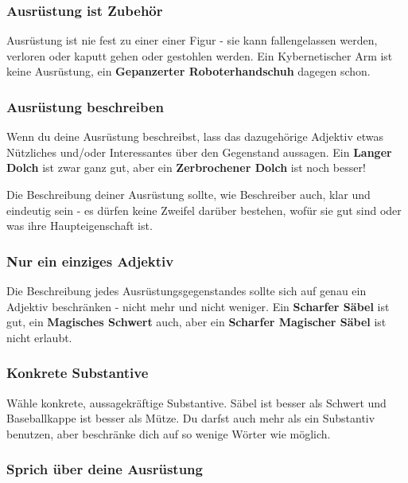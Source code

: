 \documentclass[]{article}
\begin{document}
\subsubsection{Ausrüstung ist
Zubehör}\label{ausruxfcstung-ist-zubehuxf6r}

Ausrüstung ist nie fest zu einer einer Figur - sie kann fallengelassen
werden, verloren oder kaputt gehen oder gestohlen werden. Ein
Kybernetischer Arm ist keine Ausrüstung, ein \textbf{Gepanzerter
Roboterhandschuh} dagegen schon.

\subsubsection{Ausrüstung beschreiben}\label{ausruxfcstung-beschreiben}

Wenn du deine Ausrüstung beschreibst, lass das dazugehörige Adjektiv
etwas Nützliches und/oder Interessantes über den Gegenstand aussagen.
Ein \textbf{Langer Dolch} ist zwar ganz gut, aber ein
\textbf{Zerbrochener Dolch} ist noch besser!

Die Beschreibung deiner Ausrüstung sollte, wie Beschreiber auch, klar
und eindeutig sein - es dürfen keine Zweifel darüber bestehen, wofür sie
gut sind oder was ihre Haupteigenschaft ist.

\subsubsection{Nur ein einziges
Adjektiv}\label{nur-ein-einziges-adjektiv}

Die Beschreibung jedes Ausrüstungsgegenstandes sollte sich auf genau ein
Adjektiv beschränken - nicht mehr und nicht weniger. Ein
\textbf{Scharfer Säbel} ist gut, ein \textbf{Magisches Schwert} auch,
aber ein \textbf{Scharfer Magischer Säbel} ist nicht erlaubt.

\subsubsection{Konkrete Substantive}\label{konkrete-substantive}

Wähle konkrete, aussagekräftige Substantive. Säbel ist besser als
Schwert und Baseballkappe ist besser als Mütze. Du darfst auch mehr als
ein Substantiv benutzen, aber beschränke dich auf so wenige Wörter wie
möglich.

\subsubsection{Sprich über deine
Ausrüstung}\label{sprich-uxfcber-deine-ausruxfcstung}
\end{document}

